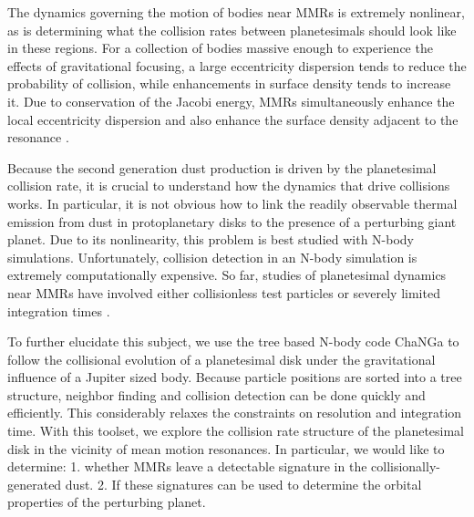 \documentclass[onecolumn]{aastex63}
\begin{document}
The dynamics governing the motion of bodies near MMRs is extremely nonlinear, as is determining what the collision rates between 
planetesimals should look like in these regions. For a collection of bodies massive enough to experience the effects of gravitational 
focusing, a large eccentricity dispersion tends to reduce the probability of collision, while enhancements in surface density tends to 
increase it. Due to conservation of the Jacobi energy, MMRs simultaneously enhance the local eccentricity dispersion and also 
enhance the surface density adjacent to the resonance \citep{2000Icar..143...45R, 2017ApJ...850..103B}.

Because the second generation dust production is driven by the planetesimal collision rate, it is crucial to understand how the 
dynamics that drive collisions works. In particular, it is not obvious how to link the readily observable thermal emission from dust in 
protoplanetary disks to the presence of a perturbing giant planet. Due to its nonlinearity, this problem is best studied with N-body 
simulations. Unfortunately, collision detection in an N-body simulation is extremely computationally expensive. So far, studies of 
planetesimal dynamics near MMRs have involved either collisionless test particles \citep{2017ApJ...850..103B, 2016ApJ...818..159T, 
2018ApJ...857....3T} or severely limited integration times \citep{2000Icar..143...45R}.

To further elucidate this subject, we use the tree based N-body code {\sc ChaNGa}
\citep{2008IEEEpds...ChaNGa, 2015AphCom..2..1} to follow the collisional evolution of a planetesimal disk under the gravitational 
influence of a Jupiter sized body. Because particle positions are sorted into a tree structure, neighbor finding and collision detection 
can be done quickly and efficiently. This considerably relaxes the constraints on resolution and integration time. With this toolset, we 
explore the collision rate structure of the planetesimal disk in the vicinity of mean motion resonances. In particular, we would like to 
determine: 1. whether MMRs leave a detectable signature in the collisionally-generated dust. 2. If these signatures can be used to determine the orbital properties of the perturbing planet.
\end{document}
